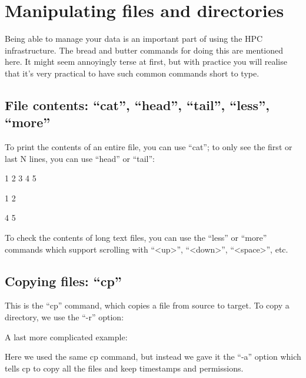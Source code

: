 \chapter{Manipulating files and directories}

Being able to manage your data is an important part of using the HPC
infrastructure.  The bread and butter commands for doing this are mentioned
here.  It might seem annoyingly terse at first, but with practice you will
realise that it's very practical to have such common commands short to type.  

\section{File contents: ``cat'', ``head'', ``tail'', ``less'', ``more''}

To print the contents of an entire file, you can use ``cat''; to only see the
first or last N lines, you can use ``head'' or ``tail'':

\begin{prompt}
1
2
3
4
5

1
2

4 
5
\end{prompt}

To check the contents of long text files, you can use the ``less'' or ``more''
commands which support scrolling with ``<up>'', ``<down>'', ``<space>'', etc.

\section{Copying files: ``cp''}

\begin{prompt}
\end{prompt}

This is the ``cp'' command, which copies a file from source to target. To copy a directory, we use the ``-r'' option:

\begin{prompt}
\end{prompt}

A last more complicated example:
\begin{prompt}
\end{prompt}

Here we used the same cp command, but instead we gave it the ``-a'' option
which tells cp to copy all the files and keep timestamps and permissions.

